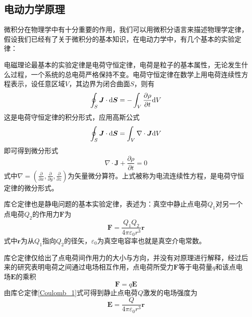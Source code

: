 \documentclass[UTF8,a4paper,10pt]{ctexart}
\begin{document}
\begin{multicols}{2}
        \subsection{电动力学原理}
        微积分在物理学中有十分重要的作用，我们可以用微积分语言来描述物理学定律，假设我们已经有了关于微积分的基本知识，在电动力学中，有几个基本的实验定律：\par
        电磁理论最基本的实验定律是电荷守恒定律，电荷是粒子的基本属性，无论发生什么过程，一个系统的总电荷严格保持不变。电荷守恒定律在数学上用电荷连续性方程表示，设任意区域$V$，其边界为闭合曲面$S$，则有
        \begin{equation}
            \oint_S\bm{J}\cdot {\rm d}\bm{S} = -\int_V\frac{\partial\rho}{\partial t}{\rm d}V
        \end{equation}
        这是电荷守恒定律的积分形式，应用高斯公式
        \begin{equation*}
            \oint_S\bm{J}\cdot {\rm d}\bm{S} = \int_V\nabla\cdot\bm{J}{\rm d}V
        \end{equation*}
        即可得到微分形式
        \begin{equation}\label{continuity equation}
            \nabla\cdot\bm{J} + \frac{\partial\rho}{\partial t}= 0
        \end{equation}
        式中$\nabla = (\frac{\partial}{\partial x},\frac{\partial}{\partial y},\frac{\partial}{\partial z})$为矢量微分算符。上式被称为电流连续性方程，是电荷守恒定律的微分形式。\par
        库仑定律也是静电问题的基本实验定律，表述为：真空中静止点电荷$Q_1$对另一个点电荷$Q_2$的作用力$\bm{F}$为
        \begin{equation}\label{Coulomb_1}
            \bm{F} = \frac{Q_1Q_2}{4\pi\varepsilon_0r^3}\bm{r}
        \end{equation}
        式中$\bm{r}$为从$Q_1$指向$Q_2$的径矢，$\varepsilon_0$为真空电容率也就是真空介电常数。\par
        库仑定律仅给出了点电荷间作用力的大小与方向，并没有对原理进行解释，经过后来的研究表明电荷之间通过电场相互作用，点电荷所受力$\bm{F}$等于电荷量$q$和该点电场$\bm{E}$的乘积
        \begin{equation}
            \bm{F} = q\bm{E}
        \end{equation}
        由库仑定律\eqref{Coulomb_1}式可得到静止点电荷$Q$激发的电场强度为
        \begin{equation}\label{Coulomb_2}
            \bm{E} = \frac{Q}{4\pi\varepsilon_0r^3}\bm{r}
        \end{equation}

\end{multicols}
\end{document}
